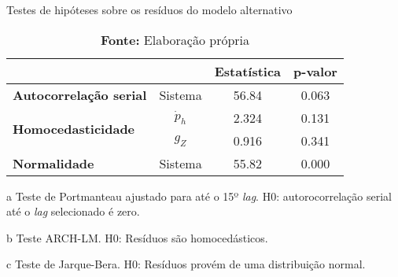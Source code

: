 \begin{table}[H]
\centering
\caption{Testes de hipóteses sobre os resíduos do modelo alternativo}
\label{testes_resduos}
	\begin{threeparttable}
\begin{tabular}{l|c|c|c}
\hline
\multicolumn{2}{l|}{} & \textbf{Estatística} & \textbf{p-valor} \\ \hline
\textbf{Autocorrelação serial}\tnote{a} & Sistema & 56.84 & 0.063 \\ \hline
\multirow{2}{*}{\textbf{Homocedasticidade}\tnote{b}} & $\dot p_h$ & 2.324 & 0.131 \\ \cline{2-4} 
 & $g_Z$ & 0.916 & 0.341 \\ \hline
\textbf{Normalidade}\tnote{c} & Sistema & 55.82 & 0.000 \\ \hline
\end{tabular}%
\begin{tablenotes}\footnotesize
	\item [a] Teste de Portmanteau ajustado para até o 15º \textit{lag}. H0: autorocorrelação serial até o \textit{lag} selecionado é zero.
	\item [b] Teste ARCH-LM. H0: Resíduos são homocedásticos.
	\item [c] Teste de Jarque-Bera. H0: Resíduos provém de uma distribuição normal.
\end{tablenotes}
\end{threeparttable}
\caption*{\textbf{Fonte:} Elaboração própria}
\end{table}
